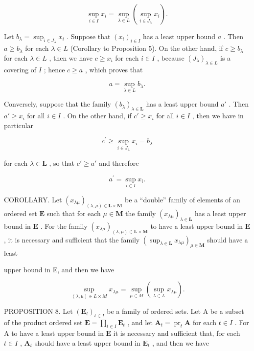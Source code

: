 \[
\sup _ {i \in I} x _ {i} = \sup _ {\lambda \in L} \left(\sup _ {i \in J _ {\lambda}} x _ {i}\right).\tag{1}
\]

Let \(b_{\lambda} = \sup_{i \in J_{\lambda}} x_i\) . Suppose that \((x_i)_{i \in I}\) has a least upper bound \(a\) . Then \(a \geqslant b_{\lambda}\) for each \(\lambda \in L\) (Corollary to Proposition 5). On the other hand, if \(c \geqslant b_{\lambda}\) for each \(\lambda \in L\) , then we have \(c \geqslant x_i\) for each \(i \in I\) , because \((J_{\lambda})_{\lambda \in L}\) is a covering of \(I\) ; hence \(c \geqslant a\) , which proves that

\[
a = \sup _ {\lambda \in L} b _ {\lambda}.
\]

Conversely, suppose that the family \((b_{\lambda})_{\lambda \in \mathbf{L}}\) has a least upper bound \(a'\) . Then \(a' \geqslant x_{i}\) for all \(i \in I\) . On the other hand, if \(c' \geqslant x_{i}\) for all \(i \in I\) , then we have in particular

\[
c ^ {\prime} \geqslant \sup _ {i \in J _ {\lambda}} x _ {i} = b _ {\lambda}
\]

for each \(\lambda \in \mathbf{L}\) , so that \(c' \geqslant a'\) and therefore

\[
a ^ {\prime} = \sup _ {i \in I} x _ {i}.
\]

COROLLARY. Let \((x_{\lambda \mu})_{(\lambda, \mu) \in \mathbf{L} \times \mathbf{M}}\) be a ``double'' family of elements of an ordered set \(\mathbf{E}\) such that for each \(\mu \in \mathbf{M}\) the family \((x_{\lambda \mu})_{\lambda \in \mathbf{L}}\) has a least upper bound in \(\mathbf{E}\) . For the family \((x_{\lambda \mu})_{(\lambda, \mu) \in \mathbf{L} \times \mathbf{M}}\) to have a least upper bound in \(\mathbf{E}\) , it is necessary and sufficient that the family \(\left(\sup_{\lambda \in \mathbf{L}} x_{\lambda \mu}\right)_{\mu \in \mathbf{M}}\) should have a least

upper bound in E, and then we have

\[
\sup _ {(\lambda , \mu) \in L \times M} x _ {\lambda \mu} = \sup _ {\mu \in M} \left(\sup _ {\lambda \in L} x _ {\lambda \mu}\right).\tag{2}
\]

PROPOSITION 8. Let \((\mathbf{E}_t)_{t \in I}\) be a family of ordered sets. Let A be a subset of the product ordered set \(\mathbf{E} = \prod_{t \in I} \mathbf{E}_t\) , and let \(\mathbf{A}_t = \operatorname{pr}_t \mathbf{A}\) for each \(t \in I\) . For A to have a least upper bound in \(\mathbf{E}\) it is necessary and sufficient that, for each \(t \in I\) , \(\mathbf{A}_t\) should have a least upper bound in \(\mathbf{E}_t\) , and then we have

